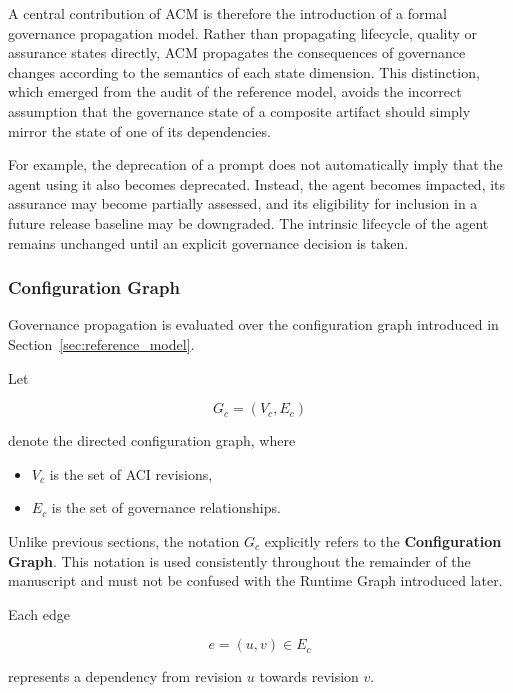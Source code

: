\documentclass[10pt]{article}
\begin{document}
A central contribution of ACM is therefore the introduction of a formal
governance propagation model. Rather than propagating lifecycle, quality or
assurance states directly, ACM propagates the consequences of governance
changes according to the semantics of each state dimension. This distinction,
which emerged from the audit of the reference model, avoids the incorrect
assumption that the governance state of a composite artifact should simply
mirror the state of one of its dependencies.

For example, the deprecation of a prompt does not automatically imply that the
agent using it also becomes deprecated. Instead, the agent becomes impacted,
its assurance may become partially assessed, and its eligibility for inclusion
in a future release baseline may be downgraded. The intrinsic lifecycle of the
agent remains unchanged until an explicit governance decision is taken.

\subsubsection{Configuration Graph}

Governance propagation is evaluated over the configuration graph introduced in
Section~\ref{sec:reference_model}.

Let

\begin{equation}
G_c=(V_c,E_c)
\label{eq:configuration_graph}
\end{equation}

denote the directed configuration graph, where

\begin{itemize}
    \item $V_c$ is the set of ACI revisions,
    \item $E_c$ is the set of governance relationships.
\end{itemize}

Unlike previous sections, the notation $G_c$ explicitly refers to the
\textbf{Configuration Graph}. This notation is used consistently throughout the
remainder of the manuscript and must not be confused with the Runtime Graph
introduced later.

Each edge

\[
e=(u,v)\in E_c
\]

represents a dependency from revision $u$ towards revision $v$.
\end{document}

